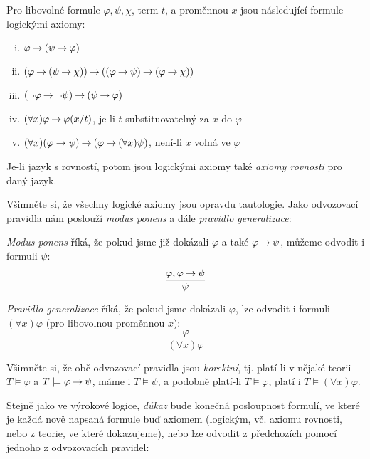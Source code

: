 \begin{definition}
Pro libovolné formule $\varphi,\psi,\chi$, term $t$, a proměnnou $x$ jsou následující formule logickými axiomy:
\begin{enumerate}[(i)]
    \item $\varphi \mathbin{\rightarrow} (\psi \mathbin{\rightarrow} \varphi)$
    \item $(\varphi\mathbin{\rightarrow} (\psi \mathbin{\rightarrow} \chi))\mathbin{\rightarrow} ((\varphi \mathbin{\rightarrow} \psi)\mathbin{\rightarrow}(\varphi \mathbin{\rightarrow} \chi))$
    \item $(\neg \varphi \mathbin{\rightarrow} \neg \psi)\mathbin{\rightarrow}(\psi \mathbin{\rightarrow} \varphi)$
    \item $(\forall x)\varphi \mathbin{\rightarrow} \varphi(x/t)$, je-li $t$ substituovatelný za $x$ do $\varphi$
    \item $(\forall x)(\varphi \to \psi) \mathbin{\rightarrow} (\varphi \mathbin{\rightarrow} (\forall x)\psi)$, není-li $x$ volná ve $\varphi$
\end{enumerate}
Je-li jazyk s rovností, potom jsou logickými axiomy také \emph{axiomy rovnosti} pro daný jazyk.       
\end{definition}

Všimněte si, že všechny logické axiomy jsou opravdu tautologie. Jako odvozovací pravidla nám poslouží \emph{modus ponens} a dále \emph{pravidlo generalizace}: 

\begin{definition}
\emph{Modus ponens} říká, že pokud jsme již dokázali $\varphi$ a také  $\varphi\mathbin{\rightarrow}\psi$, můžeme odvodit i formuli $\psi$:
$$
\frac{\varphi, \varphi \mathbin{\rightarrow} \psi}{\psi}
$$ 
\end{definition}

\begin{definition}
    \emph{Pravidlo generalizace} říká, že pokud jsme dokázali $\varphi$, lze odvodit i formuli $(\forall x)\varphi$ (pro libovolnou proměnnou $x$):
    $$
    \frac{\varphi}{(\forall x)\varphi}
    $$ 
\end{definition}

Všimněte si, že obě odvozovací pravidla jsou \emph{korektní}, tj. platí-li v nějaké teorii $T\models\varphi$ a $T\models\varphi\mathbin{\rightarrow}\psi$, máme i $T\models\psi$, a podobně platí-li $T\models\varphi$, platí i $T\models(\forall x)\varphi$.

Stejně jako ve výrokové logice, \emph{důkaz} bude konečná posloupnost formulí, ve které je každá nově napsaná formule buď axiomem (logickým, vč. axiomu rovnosti, nebo z teorie, ve které dokazujeme), nebo lze odvodit z předchozích pomocí jednoho z odvozovacích pravidel:

